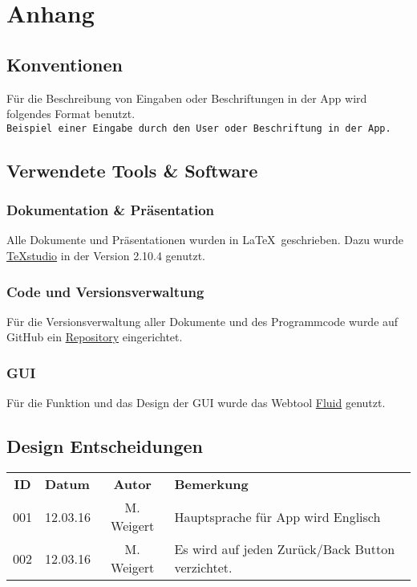 \chapter{Anhang}

\section{Konventionen}

Für die Beschreibung von Eingaben oder Beschriftungen in der App wird folgendes Format benutzt. \\
{\color{IndianRed}\texttt{Beispiel einer Eingabe durch den User oder Beschriftung in der App.}}

\section{Verwendete Tools \& Software}

\subsection{Dokumentation \& Präsentation}

Alle Dokumente und Präsentationen wurden in \LaTeX \ geschrieben. Dazu wurde \href{http://texstudio.sourceforge.net}{TeXstudio} in der Version 2.10.4 genutzt. 

\subsection{Code und Versionsverwaltung}

Für die Versionsverwaltung aller Dokumente und des Programmcode wurde auf GitHub ein \href{https://github.com/MWeigert/Collector}{Repository} eingerichtet.

\subsection{GUI}

Für die Funktion und das Design der GUI wurde das Webtool \href{https://www.fluidui.com}{Fluid} genutzt.

\section{Design Entscheidungen}

\begin{tabular}{|c|l|c|l|}
	\rowcolor{black} {\color{white}\textbf{ID}} & {\color{white}\textbf{Datum}} & {\color{white}\textbf{Autor}} & {\color{white}\textbf{Bemerkung}} \\
	001 & 12.03.16 & M. Weigert & Hauptsprache für App wird Englisch \\ \hline
	\rowcolor{DarkSeaGreen} 002 & 12.03.16 & M. Weigert & Es wird auf jeden Zurück/Back Button verzichtet. \\ \hline
\end{tabular}